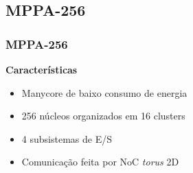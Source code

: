 \documentclass[xcolor={table}]{beamer}
\begin{document}
\subsection{MPPA-256}
\begin{frame}\frametitle{MPPA-256}
    \textbf{Características}

    \begin{itemize}
        \item {Manycore de baixo consumo de energia}
        \item {256 núcleos organizados em 16 clusters}
        \item {4 subsistemas de E/S}
        \item {Comunicação feita por NoC \textit{torus} 2D}
    \end{itemize}

    \begin{center}

\end{center}
\end{frame}
\end{document}
